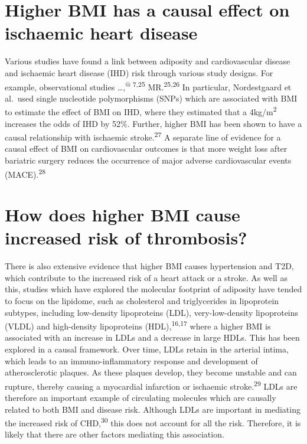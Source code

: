 \documentclass[11pt,twoside]{bristolthesis}
\begin{document}
\hypertarget{higher-bmi-has-a-causal-effect-on-ischaemic-heart-disease}{%
\section{Higher BMI has a causal effect on ischaemic heart disease}\label{higher-bmi-has-a-causal-effect-on-ischaemic-heart-disease}}

Various studies have found a link between adiposity and cardiovascular disease and ischaemic heart disease (IHD) risk through various study designs. For example, observational studies \ldots{},\textsuperscript{@ 7,25} MR.\textsuperscript{25,26} In particular, Nordestgaard et al.~used single nucleotide polymorphisms (SNPs) which are associated with BMI to estimate the effect of BMI on IHD, where they estimated that a 4kg/m\textsuperscript{2} increases the odds of IHD by 52\%. Further, higher BMI has been shown to have a causal relationship with ischaemic stroke.\textsuperscript{27} A separate line of evidence for a causal effect of BMI on cardiovascular outcomes is that more weight loss after bariatric surgery reduces the occurrence of major adverse cardiovascular events (MACE).\textsuperscript{28}

\hypertarget{how-does-higher-bmi-cause-increased-risk-of-thrombosis}{%
\section{How does higher BMI cause increased risk of thrombosis?}\label{how-does-higher-bmi-cause-increased-risk-of-thrombosis}}

There is also extensive evidence that higher BMI causes hypertension and T2D, which contribute to the increased risk of a heart attack or a stroke. As well as this, studies which have explored the molecular footprint of adiposity have tended to focus on the lipidome, such as cholesterol and triglycerides in lipoprotein subtypes, including low-density lipoproteins (LDL), very-low-density lipoproteins (VLDL) and high-density lipoproteins (HDL),\textsuperscript{16,17} where a higher BMI is associated with an increase in LDLs and a decrease in large HDLs. This has been explored in a causal framework. Over time, LDLs retain in the arterial intima, which leads to an immuno-inflammatory response and development of atherosclerotic plaques. As these plaques develop, they become unstable and can rupture, thereby causing a myocardial infarction or ischaemic stroke.\textsuperscript{29} LDLs are therefore an important example of circulating molecules which are causally related to both BMI and disease risk. Although LDLs are important in mediating the increased risk of CHD,\textsuperscript{30} this does not account for all the risk. Therefore, it is likely that there are other factors mediating this association.
\end{document}
